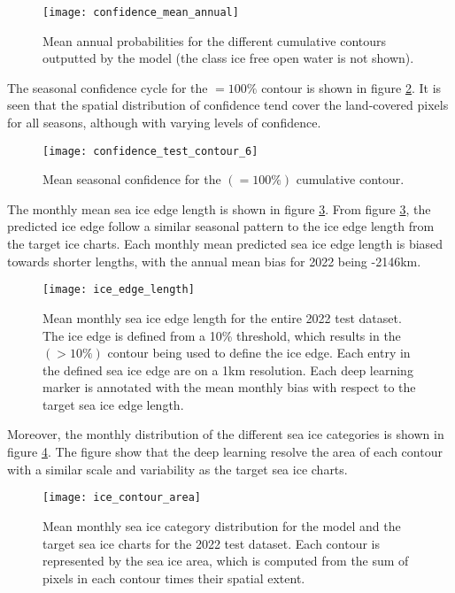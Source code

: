\documentclass[../main/thesis.tex]{subfiles}
\begin{document}
\begin{figure}
    \centering
    \texttt{[image: confidence\_mean\_annual]}
    \caption{\label{fig:mean_annual_confidence}Mean annual probabilities for the different cumulative contours outputted by the model (the class ice free open water is not shown).}
\end{figure}

The seasonal confidence cycle for the $=100\%$ contour is shown in figure \ref{fig:confidence_seasonal}. It is seen that the spatial distribution of confidence tend cover the land-covered pixels for all seasons, although with varying levels of confidence.

\begin{figure}
    \centering
    \texttt{[image: confidence\_test\_contour\_6]}
    \caption{\label{fig:confidence_seasonal}Mean seasonal confidence for the $(=100\%)$ cumulative contour.}
\end{figure}

The monthly mean sea ice edge length is shown in figure \ref{fig:ice-edge-length}. From figure \ref{fig:ice-edge-length}, the predicted ice edge follow a similar seasonal pattern to the ice edge length from the target ice charts. Each monthly mean predicted sea ice edge length is biased towards shorter lengths, with the annual mean bias for 2022 being -2146km.

\begin{figure}
    \centering
    \texttt{[image: ice\_edge\_length]}
    \caption{\label{fig:ice-edge-length}Mean monthly sea ice edge length for the entire 2022 test dataset. The ice edge is defined from a 10\% threshold, which results in the $(> 10\%)$ contour being used to define the ice edge. Each entry in the defined sea ice edge are on a 1km resolution. Each deep learning marker is annotated with the mean monthly bias with respect to the target sea ice edge length.}
\end{figure}

Moreover, the monthly distribution of the different sea ice categories is shown in figure \ref{fig:ice-contour-area}. The figure show that the deep learning resolve the area of each contour with a similar scale and variability as the target sea ice charts. 

\begin{figure}
    \centering
    \texttt{[image: ice\_contour\_area]}
    \caption{\label{fig:ice-contour-area}Mean monthly sea ice category distribution for the model and the target sea ice charts for the 2022 test dataset. Each contour is represented by the sea ice area, which is computed from the sum of pixels in each contour times their spatial extent.}
\end{figure}
\end{document}
